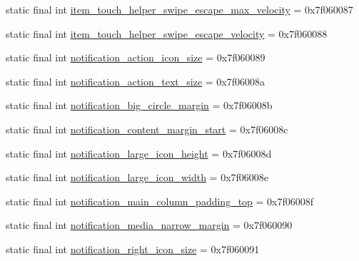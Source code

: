 \begin{DoxyCompactItemize}
\item 
static final int \mbox{\hyperlink{classcom_1_1synnapps_1_1carouselview_1_1_r_1_1dimen_ac1b2ce9e156319490072f7eb4bd5ca15}{item\+\_\+touch\+\_\+helper\+\_\+swipe\+\_\+escape\+\_\+max\+\_\+velocity}} = 0x7f060087
\item 
static final int \mbox{\hyperlink{classcom_1_1synnapps_1_1carouselview_1_1_r_1_1dimen_a9155767891c0c6e7aaed6dec2b21be12}{item\+\_\+touch\+\_\+helper\+\_\+swipe\+\_\+escape\+\_\+velocity}} = 0x7f060088
\item 
static final int \mbox{\hyperlink{classcom_1_1synnapps_1_1carouselview_1_1_r_1_1dimen_a371c4c881ef3651706b3a912ff895530}{notification\+\_\+action\+\_\+icon\+\_\+size}} = 0x7f060089
\item 
static final int \mbox{\hyperlink{classcom_1_1synnapps_1_1carouselview_1_1_r_1_1dimen_a4abbd9307278985b2c20057865c4ec90}{notification\+\_\+action\+\_\+text\+\_\+size}} = 0x7f06008a
\item 
static final int \mbox{\hyperlink{classcom_1_1synnapps_1_1carouselview_1_1_r_1_1dimen_a81a0f6fa156ab7e279c8da06592931cb}{notification\+\_\+big\+\_\+circle\+\_\+margin}} = 0x7f06008b
\item 
static final int \mbox{\hyperlink{classcom_1_1synnapps_1_1carouselview_1_1_r_1_1dimen_a1036a0ff7930e162707615fac11d1720}{notification\+\_\+content\+\_\+margin\+\_\+start}} = 0x7f06008c
\item 
static final int \mbox{\hyperlink{classcom_1_1synnapps_1_1carouselview_1_1_r_1_1dimen_a9e073a11b88404fce54f9848a22186de}{notification\+\_\+large\+\_\+icon\+\_\+height}} = 0x7f06008d
\item 
static final int \mbox{\hyperlink{classcom_1_1synnapps_1_1carouselview_1_1_r_1_1dimen_a908d4efe420d2871c2fe25cca15d78da}{notification\+\_\+large\+\_\+icon\+\_\+width}} = 0x7f06008e
\item 
static final int \mbox{\hyperlink{classcom_1_1synnapps_1_1carouselview_1_1_r_1_1dimen_a4c80c96f01250a96533b183c929e1b3d}{notification\+\_\+main\+\_\+column\+\_\+padding\+\_\+top}} = 0x7f06008f
\item 
static final int \mbox{\hyperlink{classcom_1_1synnapps_1_1carouselview_1_1_r_1_1dimen_ac96e727808da7f7ca14692d1bf748f3b}{notification\+\_\+media\+\_\+narrow\+\_\+margin}} = 0x7f060090
\item 
static final int \mbox{\hyperlink{classcom_1_1synnapps_1_1carouselview_1_1_r_1_1dimen_afa3668f20f7c521a1bea0963b3d8a7e3}{notification\+\_\+right\+\_\+icon\+\_\+size}} = 0x7f060091
\item 

\end{DoxyCompactItemize}
